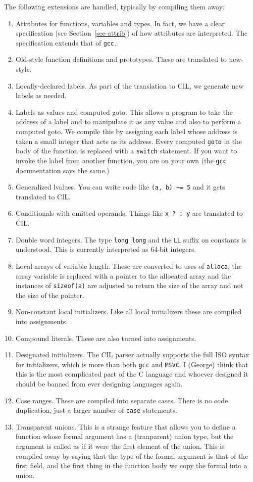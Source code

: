 \documentclass[letterpaper]{article}
\def\secref#1{Section~\ref{sec-#1}}
\def\t#1{{\tt #1}}
\begin{document}
 The following extensions are handled, typically by compiling them away:
\begin{enumerate}
\item Attributes for functions, variables and types. In fact, we have a clear
specification (see \secref{attrib}) of how attributes are interpreted. The
specification extends that of \t{gcc}.
\item Old-style function definitions and prototypes. These are translated to
new-style. 
\item Locally-declared labels. As part of the translation to CIL, we generate
new labels as needed. 
\item Labels as values and computed goto. This allows a program to take the
address of a label and to manipulate it as any value and also to perform a
computed goto. We compile this by assigning each label whose address is taken
a small integer that acts as its address. Every computed \t{goto} in the body
of the function is replaced with a \t{switch} statement. If you want to invoke
the label from another function, you are on your own (the \t{gcc}
documentation says the same.)
\item Generalized lvalues. You can write code like \t{(a, b) += 5} and it gets
translated to CIL. 
\item Conditionals with omitted operands. Things like \t{x ? : y} are
translated to CIL.
\item Double word integers. The type \t{long long} and the \t{LL} suffix on
constants is understood. This is currently interpreted as 64-bit integers.
\item Local arrays of variable length. These are converted to uses of
\t{alloca}, the array variable is replaced with a pointer to the allocated
array and the instances of \t{sizeof(a)} are adjusted to return the size of
the array and not the size of the pointer. 
\item Non-constant local initializers. Like all local initializers these are
compiled into assignments. 
\item Compound literals. These are also turned into assignments.
\item Designated initializers. The CIL parser actually supports the full ISO
syntax for initializers, which is more than both \t{gcc} and \t{MSVC}. I
(George) think that this is the most complicated part of the C language and
whoever designed it should be banned from ever designing languages again.
\item Case ranges. These are compiled into separate cases. There is no code
duplication, just a larger number of \t{case} statements.
\item Transparent unions. This is a strange feature that allows you to define
a function whose formal argument has a (tranparent) union type, but the
argument is called as if it were the first element of the union. This is
compiled away by saying that the type of the formal argument is that of the
first field, and the first thing in the function body we copy the formal into
a union. 


\end{enumerate}
\end{document}
